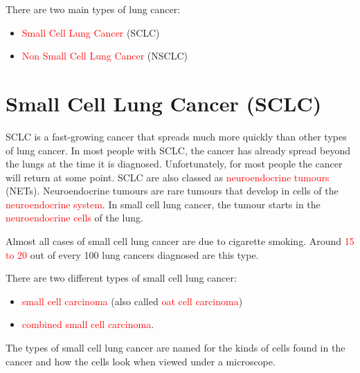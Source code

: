There are two main types of lung cancer:
\begin{outline}
\begin{itemize}
    \item \textcolor{red}{Small Cell Lung Cancer} (SCLC)
    \item \textcolor{red}{Non Small Cell Lung Cancer} (NSCLC)    
\end{itemize}
\end{outline}
\section {Small Cell Lung Cancer (SCLC)}

SCLC is a fast-growing cancer that spreads much more quickly than other types of lung cancer. In most people with SCLC, the cancer has already spread beyond the lungs at the time it is diagnosed. Unfortunately, for most people the cancer will return at some point. SCLC are also classed as \textcolor{red}{neuroendocrine tumours} (NETs). Neuroendocrine tumours are rare tumours that develop in cells of the \textcolor{red}{neuroendocrine system}. In small cell lung cancer, the tumour starts in the \textcolor{red}{neuroendocrine cells} of the lung.

\begin{remark}
Almost all cases of small cell lung cancer are due to cigarette smoking. Around \textcolor{red}{15 to 20} out of every 100 lung cancers diagnosed are this type. 
\end{remark}

There are two different types of small cell lung cancer:
\begin{outline}
\begin{itemize}
    \item \textcolor{red}{small cell carcinoma} (also called \textcolor{red}{oat cell carcinoma})
    \item \textcolor{red}{combined small cell carcinoma}.
\end{itemize}
\end{outline}
\begin{remark}
The types of small cell lung cancer are named for the kinds of cells found in the cancer and how the cells look when viewed under a microscope. 
\end{remark}

